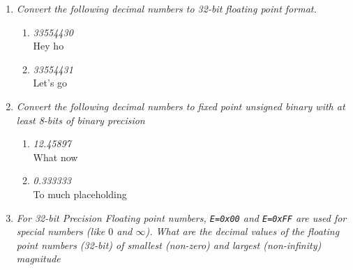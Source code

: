 \documentclass[12pt]{article}
\begin{document}
\begin{enumerate}
\begin{enumerate}
  \end{enumerate}

\newpage
\item \textit{Convert the following decimal numbers to 32-bit floating point format.}
  \begin{enumerate}
      \item \textit{33554430} \\
          Hey ho
      \item \textit{33554431} \\
          Let's go
  \end{enumerate}

\newpage
\item \textit{Convert the following decimal numbers to fixed point unsigned binary with at least 8-bits of binary precision}
  \begin{enumerate}
      \item \textit{12.45897} \\
          What now
      \item \textit{0.333333} \\
          To much placeholding
  \end{enumerate}

\newpage
\item \textit{For 32-bit Precision Floating point numbers, {\tt E=0x00} and {\tt E=0xFF} are used for special numbers (like $0$ and $\infty$). What are the decimal values of the floating point numbers (32-bit) of smallest (non-zero) and largest (non-infinity) magnitude}
\end{enumerate}
\end{document}
